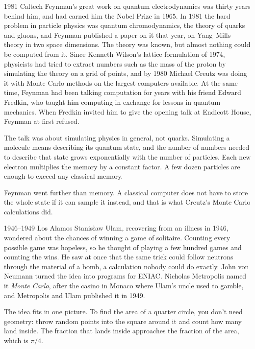 \begin{history}{1981 \textperiodcentered{} Caltech}
Feynman's great work on quantum electrodynamics was thirty years behind him, and
had earned him the Nobel Prize in 1965. In 1981 the hard problem in particle
physics was quantum chromodynamics, the theory of quarks and gluons, and Feynman
published a paper on it that year, on Yang--Mills theory in two space dimensions.
The theory was known, but almost nothing could be computed from it. Since Kenneth
Wilson's lattice formulation of 1974, physicists had tried to extract numbers such
as the mass of the proton by simulating the theory on a grid of points, and by
1980 Michael Creutz was doing it with Monte Carlo methods on the largest computers
available. At the same time, Feynman had been talking computation for years with
his friend Edward Fredkin, who taught him computing in exchange for lessons in
quantum mechanics. When Fredkin invited him to give the opening talk at Endicott
House, Feynman at first refused.
\end{history}

The talk was about simulating physics in general, not quarks. Simulating a
molecule means describing its quantum state, and the number of numbers needed to
describe that state grows exponentially with the number of particles. Each new
electron multiplies the memory by a constant factor. A few dozen particles are
enough to exceed any classical memory.

Feynman went further than memory. A classical computer does not have to store the
whole state if it can sample it instead, and that is what Creutz's Monte Carlo
calculations did.

\begin{history}{1946--1949 \textperiodcentered{} Los Alamos}
Stanisław Ulam, recovering from an illness in 1946, wondered about the chances of
winning a game of solitaire. Counting every possible game was hopeless, so he
thought of playing a few hundred games and counting the wins. He saw at once that
the same trick could follow neutrons through the material of a bomb, a calculation
nobody could do exactly. John von Neumann turned the idea into programs for ENIAC.
Nicholas Metropolis named it \emph{Monte Carlo}, after the casino in Monaco where
Ulam's uncle used to gamble, and Metropolis and Ulam published it in 1949.
\end{history}

The idea fits in one picture. To find the area of a quarter circle, you don't need
geometry: throw random points into the square around it and count how many land
inside. The fraction that lands inside approaches the fraction of the area, which
is $\pi/4$.

